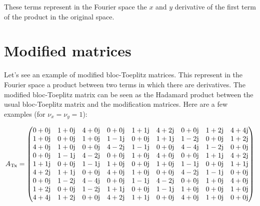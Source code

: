 These terms represent in the Fourier space the $x$ and $y$ derivative of the first term of the product in the original space.

\section{Modified matrices}
\label{sec_modified_toeplitz_examples}
Let's see an example of modified bloc-Toeplitz matrices. This represent in the Fourier space a product between two terms in which there are derivatives.
The modified bloc-Toeplitz matrix can be seen as the Hadamard product between the usual bloc-Toeplitz matrix and the modification matrices. Here are a few examples (for $\nu_x=\nu_y=1$):

{\footnotesize
\begin{equation}
A_\mathrm{Tx}=
\begin{pmatrix}
  0 + 0\mathrm{j} &   1 + 0\mathrm{j} &   4 + 0\mathrm{j} &   0 + 0\mathrm{j} &   1 + 1\mathrm{j} &   4 + 2\mathrm{j} &   0 + 0\mathrm{j} &   1 + 2\mathrm{j} &   4 + 4\mathrm{j} \\
   1 + 0\mathrm{j} &   0 + 0\mathrm{j} &   1 + 0\mathrm{j} &   1 - 1\mathrm{j} &   0 + 0\mathrm{j} &   1 + 1\mathrm{j} &   1 - 2\mathrm{j} &   0 + 0\mathrm{j} &   1 + 2\mathrm{j} \\
   4 + 0\mathrm{j} &   1 + 0\mathrm{j} &   0 + 0\mathrm{j} &   4 - 2\mathrm{j} &   1 - 1\mathrm{j} &   0 + 0\mathrm{j} &   4 - 4\mathrm{j} &   1 - 2\mathrm{j} &   0 + 0\mathrm{j} \\
   0 + 0\mathrm{j} &   1 - 1\mathrm{j} &   4 - 2\mathrm{j} &   0 + 0\mathrm{j} &   1 + 0\mathrm{j} &   4 + 0\mathrm{j} &   0 + 0\mathrm{j} &   1 + 1\mathrm{j} &   4 + 2\mathrm{j} \\
   1 + 1\mathrm{j} &   0 + 0\mathrm{j} &   1 - 1\mathrm{j} &   1 + 0\mathrm{j} &   0 + 0\mathrm{j} &   1 + 0\mathrm{j} &   1 - 1\mathrm{j} &   0 + 0\mathrm{j} &   1 + 1\mathrm{j} \\
   4 + 2\mathrm{j} &   1 + 1\mathrm{j} &   0 + 0\mathrm{j} &   4 + 0\mathrm{j} &   1 + 0\mathrm{j} &   0 + 0\mathrm{j} &   4 - 2\mathrm{j} &   1 - 1\mathrm{j} &   0 + 0\mathrm{j} \\
   0 + 0\mathrm{j} &   1 - 2\mathrm{j} &   4 - 4\mathrm{j} &   0 + 0\mathrm{j} &   1 - 1\mathrm{j} &   4 - 2\mathrm{j} &   0 + 0\mathrm{j} &   1 + 0\mathrm{j} &   4 + 0\mathrm{j} \\
   1 + 2\mathrm{j} &   0 + 0\mathrm{j} &   1 - 2\mathrm{j} &   1 + 1\mathrm{j} &   0 + 0\mathrm{j} &   1 - 1\mathrm{j} &   1 + 0\mathrm{j} &   0 + 0\mathrm{j} &   1 + 0\mathrm{j} \\
   4 + 4\mathrm{j} &   1 + 2\mathrm{j} &   0 + 0\mathrm{j} &   4 + 2\mathrm{j} &   1 + 1\mathrm{j} &   0 + 0\mathrm{j} &   4 + 0\mathrm{j} &   1 + 0\mathrm{j} &   0 + 0\mathrm{j} 
\end{pmatrix}
\end{equation}}
